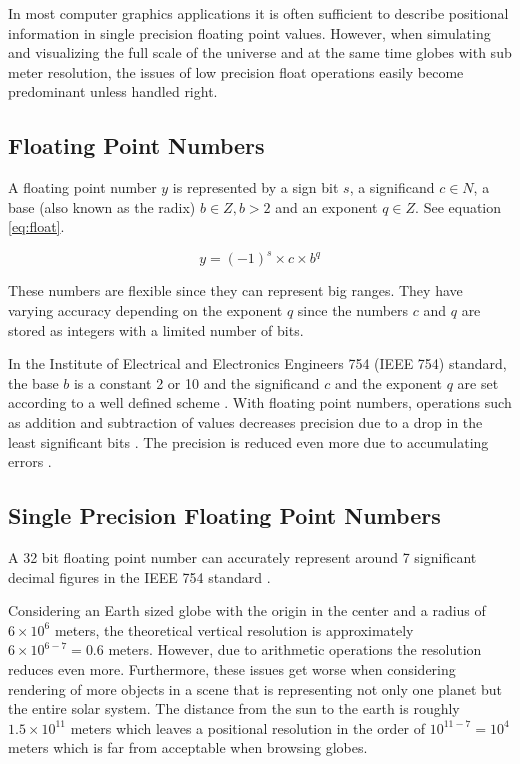 In most computer graphics applications it is often sufficient to describe positional information in single precision floating point values. However, when simulating and visualizing the full scale of the universe and at the same time globes with sub meter resolution, the issues of low precision float operations easily become predominant unless handled right.

\subsection{Floating Point Numbers}
A floating point number $y$ is represented by a sign bit $s$, a significand $c \in N$, a base (also known as the radix) $b \in Z, b > 2$ and an exponent $q \in Z$. See equation \ref{eq:float}.

\begin{equation}
\label{eq:float}
y=(-1)^s \times c \times b^q
\end{equation}

These numbers are flexible since they can represent big ranges. They have varying accuracy depending on the exponent $q$ since the numbers $c$ and $q$ are stored as integers with a limited number of bits.

In the Institute of Electrical and Electronics Engineers 754 (IEEE 754) standard, the base $b$ is a constant 2 or 10 and the significand $c$ and the exponent $q$ are set according to a well defined scheme \cite{ieee754}. With floating point numbers, operations such as addition and subtraction of values decreases precision due to a drop in the least significant bits \cite{cozzi11}. The precision is reduced even more due to accumulating errors \cite{cozzi11}.

\subsection{Single Precision Floating Point Numbers}

A 32 bit floating point number can accurately represent around 7 significant decimal figures in the IEEE 754 standard \cite{cozzi11}.

Considering an Earth sized globe with the origin in the center and a radius of $6 \times 10^6$ meters, the theoretical vertical resolution is approximately $6 \times 10^{6-7} = 0.6$ meters. However, due to arithmetic operations the resolution reduces even more. Furthermore,  these issues get worse when considering rendering of more objects in a scene that is representing not only one planet but the entire solar system. The distance from the sun to the earth is roughly $1.5 \times 10^{11}$ meters which leaves a positional resolution in the order of $10^{11 - 7} = 10^4$ meters which is far from acceptable when browsing globes.

